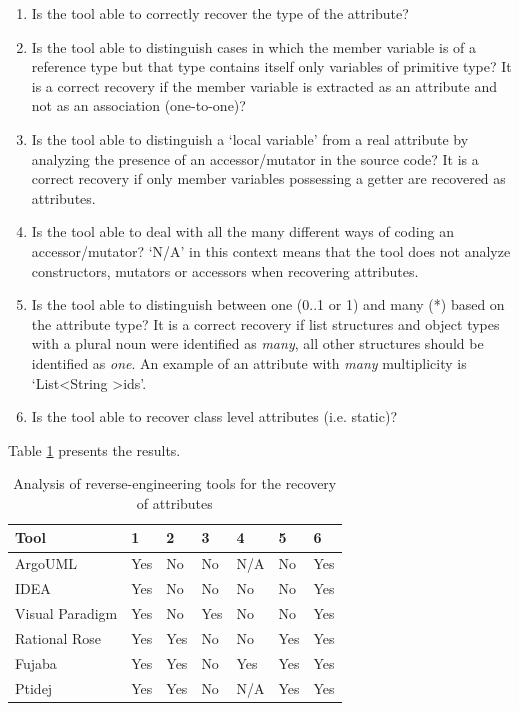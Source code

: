 \begin{enumerate}
\item Is the tool able to correctly recover the type of the attribute?

\item Is the tool able to distinguish cases in which the member variable is of a reference type but that type contains itself only variables of primitive type? It is a correct recovery if the member variable is extracted as an attribute and not as an association (one-to-one)?

\item Is the tool able to distinguish a `local variable' from a real attribute by analyzing the presence of an accessor/mutator in the source code?  It is a correct recovery if only member variables possessing a getter are recovered as attributes. 

\item Is the tool able to deal with all the many different ways of coding an accessor/mutator? `N/A' in this context means that the tool does not analyze constructors, mutators or accessors when recovering attributes. 

\item Is the tool able to distinguish between one (0..1 or 1) and many (*) based on the attribute type? It is a correct recovery if list structures and object types with a plural noun were identified as \textit{many}, all other structures should be identified as \textit{one}. An example of an attribute with  \textit{many} multiplicity is `List\textless String \textgreater ids'.

\item Is the tool able to recover class level attributes (i.e. static)?
\end{enumerate}

Table \ref{table:analyzeAttributesSecondPart} presents the results.

\begin{table}[h]
\caption{Analysis of reverse-engineering tools for the recovery of attributes}
\label{table:analyzeAttributesSecondPart}
\centering
\begin{tabular}{lllllll}
\toprule
\rowcolor[HTML]{BBDAFF}
\textbf{Tool}   & \textbf{1}    & \textbf{2}   &  \textbf{3}   &  \textbf{4} &  \textbf{5}  &  \textbf{6} \\ 
\hline
ArgoUML & Yes & No & No & N/A & No & Yes\\ 
IDEA & Yes & No & No & No & No  & Yes\\ 
Visual Paradigm & Yes & No & Yes & No & No & Yes \\ 
Rational Rose & Yes & Yes & No & No & Yes & Yes\\ 
Fujaba & Yes & Yes & No & Yes & Yes & Yes\\ 
Ptidej & Yes & Yes & No & N/A & Yes & Yes\\ 
\hline
\end{tabular}
\end{table}

